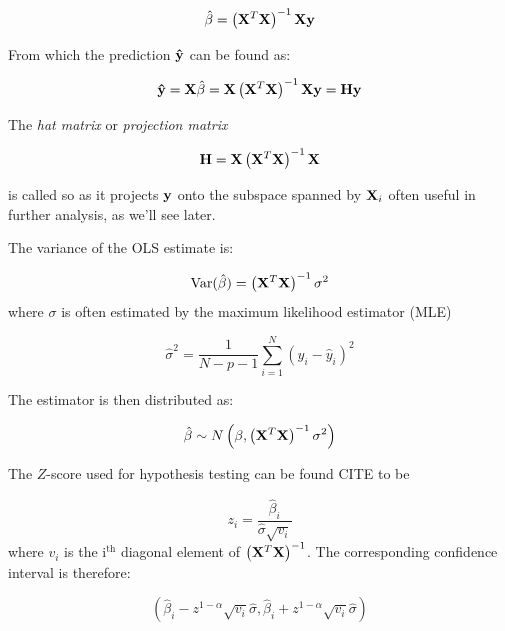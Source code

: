 \begin{equation*}
  \hat\beta = \left(\vb{X}^{T}\vb{X}\right)^{-1}\vb{X}\vb{y}
\end{equation*}

From which the prediction \(\vb{\hat y}\) can be found as:

\begin{equation*}
  \vb{\hat y} = \vb{X}\hat\beta = \vb{X}\left(\vb{X}^{T}\vb{X}\right)^{-1}\vb{X}\vb{y} = \vb{H}\vb{y}
\end{equation*}

The \textit{hat matrix} or \textit{projection matrix}

\begin{equation*}
  \vb{H} =\vb{X}\left(\vb{X}^{T}\vb{X}\right)^{-1}\vb{X} 
\end{equation*}

is called so as it
projects \(\vb{y}\) onto the subspace spanned by \(\vb{X}_{i}\)
often useful in further analysis, as we'll see later.

The variance of the OLS estimate is:

\begin{equation*}
  \text{Var}(\hat\beta) = \left( \vb{X}^{T}\vb{X} \right)^{-1}\sigma^{2}
\end{equation*}
where \(\sigma\) is often estimated by the maximum likelihood estimator (MLE)

\begin{equation*}
  \hat\sigma^{2} = \frac{1}{N-p-1}\sum_{i=1}^{N}\left( y_{i} - \hat y_{i} \right)^{2}
\end{equation*}

The estimator is then distributed as:

\begin{equation*}
\hat\beta \sim N\left( \beta, \left( \vb{X}^{T}\vb{X} \right)^{-1}\sigma^{2} \right)
\end{equation*}

The \(Z\)-score used for hypothesis testing can be found CITE to be

\begin{equation*}
  z_{i} = \frac{\hat\beta_{i}}{\hat\sigma\sqrt{v_{i}}}
\end{equation*}
where \(v_{i}\) is the \(\text{i}^{\text{th}}\) diagonal element of \(\left( \vb{X}^{T}\vb{X} \right)^{-1}\).
The corresponding confidence interval is therefore:

\begin{equation*}
  \left( \hat\beta_{i} - z^{1-\alpha}\sqrt{v_{i}}\hat\sigma,  \hat\beta_{i} + z^{1-\alpha}\sqrt{v_{i}}\hat\sigma\right)
\end{equation*}

